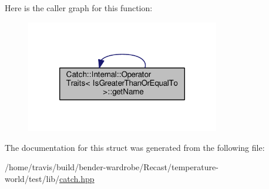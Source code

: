 Here is the caller graph for this function\-:
\nopagebreak
\begin{figure}[H]
\begin{center}
\leavevmode
\includegraphics[width=240pt]{struct_catch_1_1_internal_1_1_operator_traits_3_01_is_greater_than_or_equal_to_01_4_a76b6f6b0dbaf7d19ebb1b4b4891e719e_icgraph}
\end{center}
\end{figure}




The documentation for this struct was generated from the following file\-:\begin{DoxyCompactItemize}
\item 
/home/travis/build/bender-\/wardrobe/\-Recast/temperature-\/world/test/lib/\hyperlink{catch_8hpp}{catch.\-hpp}\end{DoxyCompactItemize}
